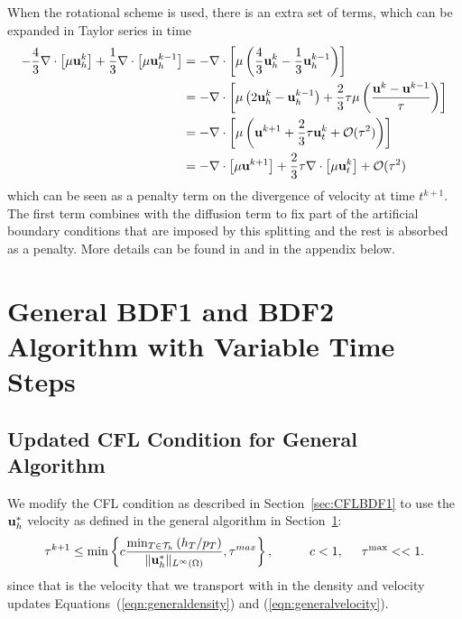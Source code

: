 \documentclass[letterpaper]{erdc}
\begin{document}
\begin{remark}
  When the rotational scheme is used, there is an extra set of terms, which can be expanded in Taylor series in time 
  \begin{align}
    -\frac{4}{3}\nabla\cdot\left[\mu\textbf{u}_h^{k}\right] + \frac{1}{3}\nabla\cdot\left[\mu\textbf{u}_h^{k-1}\right] &= -\nabla\cdot\left[\mu\left(\frac{4}{3}\textbf{u}_h^{k} - \frac{1}{3}\textbf{u}_h^{k-1} \right)\right]\\
    &= -\nabla\cdot\left[\mu \left(2\textbf{u}_h^{k} - \textbf{u}_h^{k-1}  \right) + \frac{2}{3}\tau\mu\left( \frac{\textbf{u}^{k} - \textbf{u}^{k-1}}{\tau} \right)   \right]\\
    &= -\nabla\cdot\left[\mu\left( \textbf{u}^{k+1} + \frac{2}{3}\tau\textbf{u}_t^{k} + \mathcal{O}(\tau^{2}) \right)\right]\\
    &= -\nabla\cdot\left[\mu\textbf{u}^{k+1}\right] + \frac{2}{3}\tau\nabla\cdot\left[\mu\textbf{u}_t^{k}\right] + \mathcal{O}(\tau^{2})
  \end{align}
  which can be seen as a penalty term on the divergence of velocity at time $t^{k+1}$.  The first term combines with the diffusion term to fix part of the artificial boundary conditions that are imposed by this splitting and the rest is absorbed as a penalty.  More details can be found in \cite{guermond2004error} and in the appendix below.

\end{remark}


%
%
%
\section{General BDF1 and BDF2 Algorithm with Variable Time Steps}\label{sec:generalalgorithm}




\subsection{Updated CFL Condition for General Algorithm}
We modify the CFL condition as described in Section~\ref{sec:CFLBDF1} to use the $\textbf{u}_h^{*}$ velocity as defined in the general algorithm in Section~\ref{sec:generalalgorithm}:
\begin{equation}
  \tau^{k+1} \leq \min \left\{c \frac{\min_{T\in\mathcal{T}_h}\left(h_{T}/p_T\right)}{\|\textbf{u}_h^{*}\|_{L^{\infty}(\Omega)}}, \tau^{max}\right\}, \hspace{1cm} c<1, \hspace{0.5cm}\tau^{\max} << 1.
\end{equation}
since that is the velocity that we transport with in the density and velocity updates Equations~(\ref{eqn:generaldensity}) and (\ref{eqn:generalvelocity}).
\end{document}
